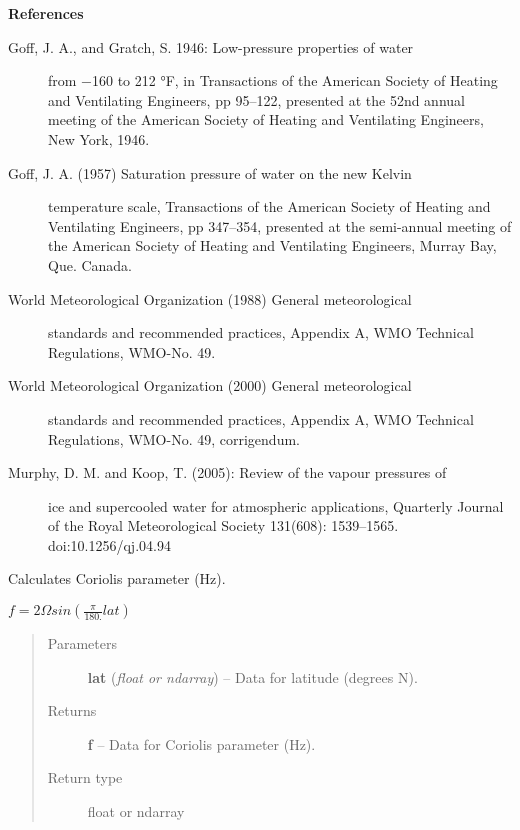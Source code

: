 \documentclass[letterpaper,10pt,english]{sphinxmanual}
\begin{document}
\begin{fulllineitems}
\textbf{References}
\begin{description}
\item[{Goff, J. A., and Gratch, S. 1946: Low-pressure properties of water}] \leavevmode
from −160 to 212 °F, in Transactions of the American Society of
Heating and Ventilating Engineers, pp 95–122, presented at the
52nd annual meeting of the American Society of Heating and
Ventilating Engineers, New York, 1946.

\item[{Goff, J. A. (1957) Saturation pressure of water on the new Kelvin}] \leavevmode
temperature scale, Transactions of the American Society of Heating and
Ventilating Engineers, pp 347–354, presented at the semi-annual meeting of
the American Society of Heating and Ventilating Engineers, Murray Bay, Que.
Canada.

\item[{World Meteorological Organization (1988) General meteorological}] \leavevmode
standards and recommended practices, Appendix A, WMO Technical Regulations,
WMO-No. 49.

\item[{World Meteorological Organization (2000) General meteorological}] \leavevmode
standards and recommended practices, Appendix A, WMO Technical Regulations,
WMO-No. 49, corrigendum.

\item[{Murphy, D. M. and Koop, T. (2005): Review of the vapour pressures of}] \leavevmode
ice and supercooled water for atmospheric applications, Quarterly Journal
of the Royal Meteorological Society 131(608): 1539–1565.
doi:10.1256/qj.04.94

\end{description}

\end{fulllineitems}


\begin{fulllineitems}
\label{atmos:atmos.equations.f_from_lat}
Calculates Coriolis parameter (Hz).

\(f = 2 \Omega sin(\frac{\pi}{180.} lat)\)
\begin{quote}\begin{description}
\item[{Parameters}] \leavevmode
\textbf{lat} (\emph{float or ndarray}) -- Data for latitude (degrees N).

\item[{Returns}] \leavevmode
\textbf{f} --
Data for Coriolis parameter (Hz).

\item[{Return type}] \leavevmode
float or ndarray

\end{description}\end{quote}

\end{fulllineitems}
\end{document}
